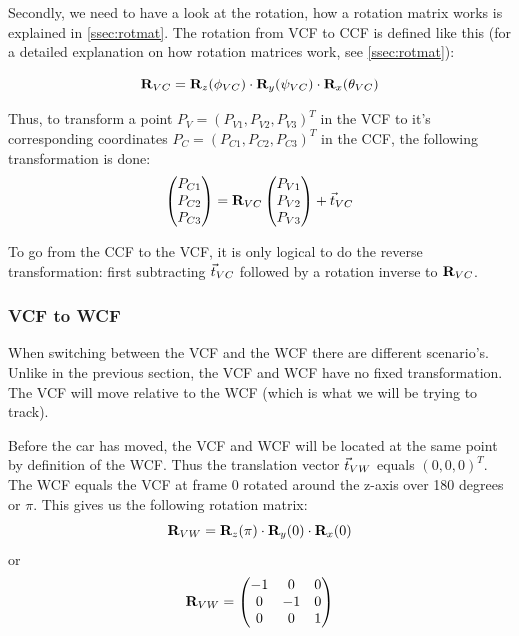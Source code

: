 Secondly, we need to have a look at the rotation, how a rotation matrix works is explained in \autoref{ssec:rotmat}. The rotation from VCF to CCF is defined like this (for a detailed explanation on how rotation matrices work, see \autoref{ssec:rotmat}):

\begin{equation}
    \mathbf{R}_{VC} = \mathbf{R}_z(\phi_{VC})\cdot\mathbf{R}_y(\psi_{VC})\cdot\mathbf{R}_x(\theta_{VC})
\end{equation}

Thus, to transform a point $P_V = (P_{V1}, P_{V2}, P_{V3})^T$ in the VCF to it's corresponding coordinates $P_C = (P_{C1}, P_{C2}, P_{C3})^T$ in the CCF, the following transformation is done:
\begin{equation}
    \begin{pmatrix}
        P_{C1} \\ P_{C2}\\ P_{C3}
    \end{pmatrix} = \mathbf{R}_{VC}\begin{pmatrix}
        P_{V1} \\ P_{V2}\\ P_{V3}
    \end{pmatrix} + \vec t_{VC} 
\end{equation}

To go from the CCF to the VCF, it is only logical to do the reverse transformation: first subtracting $\vec t_{VC}$ followed by a rotation inverse to $\mathbf{R}_{VC}$.

\subsubsection{VCF to WCF}
When switching between the VCF and the WCF there are different scenario's. Unlike in the previous section, the VCF and WCF have no fixed transformation. The VCF will move relative to the WCF (which is what we will be trying to track).\bigskip

Before the car has moved, the VCF and WCF will be located at the same point by definition of the WCF. Thus the translation vector $\vec t_{VW}$ equals $(0, 0, 0)^T$. The WCF equals the VCF at frame 0 rotated around the z-axis over 180 degrees or $\pi$. This gives us the following rotation matrix:
\begin{equation}
    \mathbf{R}_{VW} = \mathbf{R}_z(\pi)\cdot\mathbf{R}_y(0)\cdot\mathbf{R}_x(0)
\end{equation}
or
\begin{equation}
    \mathbf{R}_{VW} = \begin{pmatrix}
        -1 & 0 & 0 \\
        0 & -1 & 0 \\
        0 & 0 & 1
    \end{pmatrix}
\end{equation}

